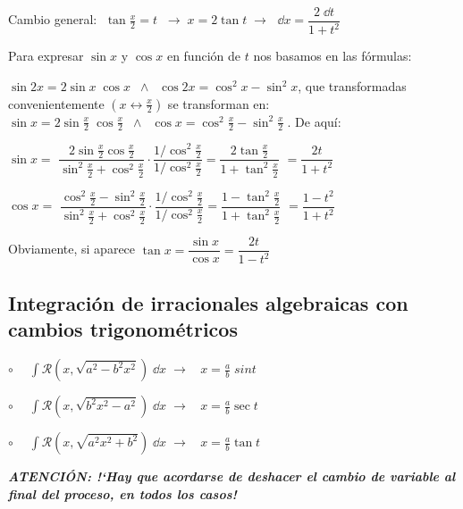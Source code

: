{ Cambio general: $\boxed{\;\tan \frac x 2 = t \;} \; \to \; x=2 \tan t \; \to \;  $ $\boxed{\dd x = \dfrac {2\; \dd t}{1+t^2}}$
 
 Para expresar $\sin x$ y $\cos x$ en función de $t$ nos basamos en las fórmulas:
 
 $\sin 2x= 2 \sin x \; \cos x \;\;  \wedge \;\;  \cos 2x= \cos^2 x - \sin^2 x$, que transformadas convenientemente $(x \leftrightarrow \frac x 2)$ se transforman en: $\sin x = 2 \sin \frac x 2 \; \cos \frac x 2 \; \; \wedge \; \; \cos x= \cos^2 \frac x 2 - \sin^2 \frac x 2\; $. De aquí:
 
 $\boxed{\sin x =} $ $\dfrac {2\sin \frac x 2 \cos \frac x 2 }{\sin^2 \frac x 2 + \cos^2 \frac x 2} \cdot \dfrac {1/\cos^2 \frac x 2}{1/ \cos^2 \frac x 2} = \dfrac {2 \tan \frac x 2}{1 + \tan^2 \frac x 2} $ $\boxed{= \dfrac {2t}{1+t^2}}$
 
  
 $\boxed{\cos x = }$ $ \dfrac {\cos^2 \frac x 2 - \sin^2 \frac x 2 }{\sin^2 \frac x 2 + \cos^2 \frac x 2} \cdot \dfrac {1/\cos^2 \frac x 2}{1/ \cos^2 \frac x 2} = \dfrac {1- \tan^2 \frac x 2}{1 + \tan^2 \frac x 2} $ $\boxed{ = \dfrac {1-t^2}{1+t^2}}$
 
 Obviamente, si aparece $\tan x= \dfrac {\sin x}{\cos x} = \dfrac {2t}{1-t^2}$
 
\subsection{Integración de irracionales algebraicas con cambios trigonométricos}

$\circ \quad  \displaystyle \; \int \mathcal {R} \left (x,\sqrt{a^2-b^2x^2}  \right) \; \dd x \; \to \; $ $\boxed{\; x= \frac a b \; sin t \; }$

$\circ \quad  \displaystyle \; \int \mathcal {R} \left (x, \sqrt{b^2x^2-a^2}  \right) \; \dd x \; \to \; $ $ \boxed{\; x= \frac a b \sec t \;} $

$\circ \quad  \displaystyle \; \int \mathcal {R}  \left ( x, \sqrt{a^2x^2+b^2} \right) \; \dd x \; \to \; $ $ \boxed{\; x=\frac a b \tan t \;} $

\vspace{3mm}

\emph{\textbf{ATENCIÓN: !`Hay que acordarse de deshacer el cambio de variable al final del proceso, en todos los casos!}}



}
